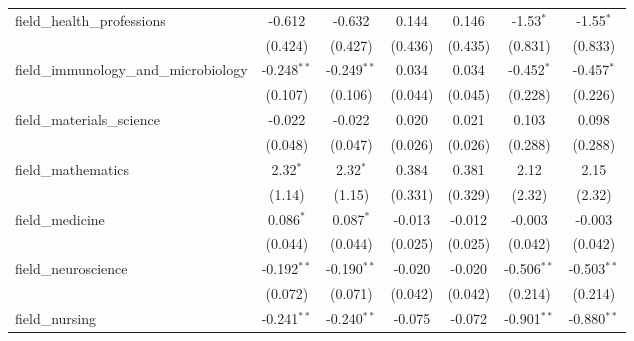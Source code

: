 \begin{tabular}{lcccccc}
   field\_health\_professions                                  & -0.612         & -0.632        & 0.144         & 0.146         & -1.53$^{*}$   & -1.55$^{*}$\\   
                                                               & (0.424)        & (0.427)       & (0.436)       & (0.435)       & (0.831)       & (0.833)\\   
   field\_immunology\_and\_microbiology                        & -0.248$^{**}$  & -0.249$^{**}$ & 0.034         & 0.034         & -0.452$^{*}$  & -0.457$^{*}$\\   
                                                               & (0.107)        & (0.106)       & (0.044)       & (0.045)       & (0.228)       & (0.226)\\   
   field\_materials\_science                                   & -0.022         & -0.022        & 0.020         & 0.021         & 0.103         & 0.098\\   
                                                               & (0.048)        & (0.047)       & (0.026)       & (0.026)       & (0.288)       & (0.288)\\   
   field\_mathematics                                          & 2.32$^{*}$     & 2.32$^{*}$    & 0.384         & 0.381         & 2.12          & 2.15\\   
                                                               & (1.14)         & (1.15)        & (0.331)       & (0.329)       & (2.32)        & (2.32)\\   
   field\_medicine                                             & 0.086$^{*}$    & 0.087$^{*}$   & -0.013        & -0.012        & -0.003        & -0.003\\   
                                                               & (0.044)        & (0.044)       & (0.025)       & (0.025)       & (0.042)       & (0.042)\\   
   field\_neuroscience                                         & -0.192$^{**}$  & -0.190$^{**}$ & -0.020        & -0.020        & -0.506$^{**}$ & -0.503$^{**}$\\   
                                                               & (0.072)        & (0.071)       & (0.042)       & (0.042)       & (0.214)       & (0.214)\\   
   field\_nursing                                              & -0.241$^{**}$  & -0.240$^{**}$ & -0.075        & -0.072        & -0.901$^{**}$ & -0.880$^{**}$\\   

\end{tabular}
